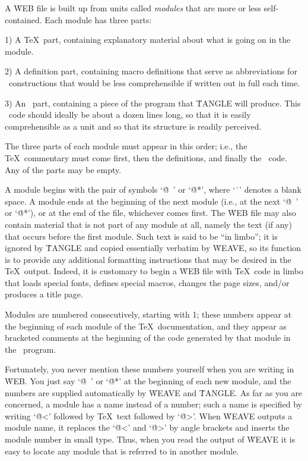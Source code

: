 A \.{WEB} file is built up from units called {\sl modules\/} that are more
or less self-contained.
Each module has three parts:

\yskip\item{1)} A \TeX\ part, containing explanatory material about what
is going on in the module.

\item{2)} A definition part, containing macro definitions that serve as
abbreviations for \PASCAL\ constructions that would be less comprehensible
if written out in full each time.

\item{3)} An \PASCAL\ part, containing a piece of the program that
\.{TANGLE} will produce.
This \PASCAL\ code should ideally be about a
dozen lines long, so that it is easily comprehensible as a unit and so
that its structure is readily perceived.

\yskip\noindent The three parts of each module must appear in this order;
i.e., the \TeX\ commentary must come first, then the definitions, and
finally the \PASCAL\ code.
Any of the parts may be empty.

A module begins with the pair of symbols `\.{@\ }' or `\.{@*}', where
`\.{\ }' denotes a blank space.
A module ends
at the beginning of the next module (i.e., at the next
`\.{@\ }' or `\.{@*}'), or at the end of the file, whichever comes first.
The \.{WEB} file may also contain material that is not part of any module
at all, namely the text (if any) that occurs before the first module.
Such text is said to be ``in limbo''; it is ignored by \.{TANGLE}
and copied essentially verbatim by \.{WEAVE}, so its function is to
provide any additional formatting instructions that may be desired in the
\TeX\ output.
Indeed, it is customary to begin a \.{WEB} file with
\TeX\ code in limbo that loads special fonts, defines special macros,
changes the page sizes, and/or produces a title page.

Modules are numbered consecutively, starting with 1; these numbers appear
at the beginning of each module of the \TeX\ documentation, and they appear
as bracketed comments at the beginning of the code generated by that
module in the \PASCAL\ program.

Fortunately, you never mention these numbers yourself when you are writing
in \.{WEB}.
You just say `\.{@\ }' or `\.{@*}' at the beginning of each
new module, and the numbers are supplied automatically by \.{WEAVE} and
\.{TANGLE}.
As far as you are concerned, a module has a
name instead of a number; such a name is specified by writing
`\.{@<}' followed by \TeX\ text followed by `\.{@>}'.
When \.{WEAVE}
outputs a module name, it replaces the `\.{@<}' and `\.{@>}' by
angle brackets and inserts the module number in small type.
Thus, when you
read the output of \.{WEAVE} it is easy to locate any module that is
referred to in another module.

